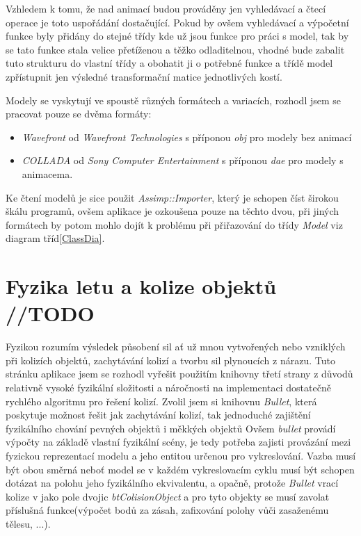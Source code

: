 Vzhledem k tomu, že nad animací budou prováděny jen vyhledávací a čtecí operace je toto uspořádání dostačující. Pokud by ovšem vyhledávací a výpočetní funkce byly přidány do stejné třídy kde už jsou funkce pro práci s model, tak by se tato funkce stala velice přetíženou a těžko odladitelnou, vhodné bude zabalit tuto strukturu do vlastní třídy a obohatit ji o potřebné funkce a třídě model zpřístupnit jen výsledné transformační matice jednotlivých kostí.

 Modely se vyskytují ve spoustě různých formátech a variacích, rozhodl jsem se pracovat pouze se dvěma formáty:
\begin{itemize}
	\item \emph{Wavefront} od \emph{Wavefront Technologies} s příponou \emph{obj} pro modely bez animací
	\item \emph{COLLADA} od \emph{Sony Computer Entertainment} s příponou \emph{dae} pro modely s animacema.
\end{itemize}

Ke čtení modelů je sice použit \emph{Assimp::Importer}, který je schopen číst širokou škálu programů, ovšem aplikace je ozkoušena pouze na těchto dvou, při jiných formátech by potom mohlo dojít k problému při přiřazování do třídy \emph{Model} viz diagram tříd\ref{ClassDia}.
\section{Fyzika letu a kolize objektů //TODO}
Fyzikou rozumím výsledek působení sil ať už mnou vytvořených nebo vzniklých při kolizích objektů, zachytávání kolizí a tvorbu sil plynoucích z nárazu. Tuto stránku aplikace jsem se rozhodl vyřešit použitím knihovny třetí strany z důvodů relativně vysoké fyzikální složitosti a náročnosti na implementaci dostatečně rychlého algoritmu pro řešení kolizí. Zvolil jsem si knihovnu \emph{Bullet}, která poskytuje možnost řešit jak zachytávání kolizí, tak jednoduché zajištění fyzikálního chování pevných objektů i měkkých objektů Ovšem \emph{bullet} provádí výpočty na základě vlastní fyzikální scény, je tedy potřeba zajisti provázání mezi fyzickou reprezentací modelu a jeho entitou určenou pro vykreslování. Vazba musí být obou směrná neboť model se v každém vykreslovacím cyklu musí být schopen dotázat na polohu jeho fyzikálního ekvivalentu, a opačně, protože \emph{Bullet} vrací kolize v jako pole dvojic \emph{btColisionObject} a pro tyto objekty se musí zavolat příslušná funkce(výpočet bodů za zásah, zafixování polohy vůči zasaženému tělesu, ...).      
